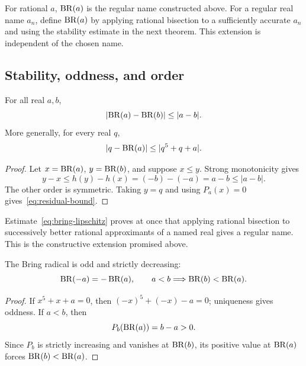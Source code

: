 \begin{definition}
For rational \(a\), \(\operatorname{BR}(a)\) is the regular name constructed above.  For a
regular real name \(a_n\), define \(\operatorname{BR}(a)\) by applying rational bisection to
a sufficiently accurate \(a_n\) and using the stability estimate in the next
theorem.  This extension is independent of the chosen name.
\end{definition}

\subsection{Stability, oddness, and order}

\begin{theorem}\label{thm:bring-lipschitz}
For all real \(a,b\),
\begin{equation}\label{eq:bring-lipschitz}
 \left|\operatorname{BR}(a)-\operatorname{BR}(b)\right|\le |a-b|.
\end{equation}
More generally, for every real \(q\),
\begin{equation}\label{eq:residual-bound}
 \left|q-\operatorname{BR}(a)\right|\le |q^5+q+a|.
\end{equation}
\end{theorem}

\begin{proof}
Let \(x=\operatorname{BR}(a)\), \(y=\operatorname{BR}(b)\), and suppose \(x\le y\).  Strong monotonicity
gives
\[
 y-x\le h(y)-h(x)=(-b)-(-a)=a-b\le|a-b|.
\]
The other order is symmetric.  Taking \(y=q\) and using
\(P_a(x)=0\) gives~\eqref{eq:residual-bound}.
\end{proof}

Estimate~\eqref{eq:bring-lipschitz} proves at once that applying rational
bisection to successively better rational approximants of a named real gives a
regular name.  This is the constructive extension promised above.

\begin{corollary}\label{cor:bring-odd-decreasing}
The Bring radical is odd and strictly decreasing:
\[
 \operatorname{BR}(-a)=-\operatorname{BR}(a),
 \qquad a<b\Longrightarrow \operatorname{BR}(b)<\operatorname{BR}(a).
\]
\end{corollary}

\begin{proof}
If \(x^5+x+a=0\), then \((-x)^5+(-x)-a=0\); uniqueness gives oddness.  If
\(a<b\), then
\[
 P_b(\operatorname{BR}(a))=b-a>0.
\]
Since \(P_b\) is strictly increasing and vanishes at \(\operatorname{BR}(b)\), its positive
value at \(\operatorname{BR}(a)\) forces \(\operatorname{BR}(b)<\operatorname{BR}(a)\).
\end{proof}

